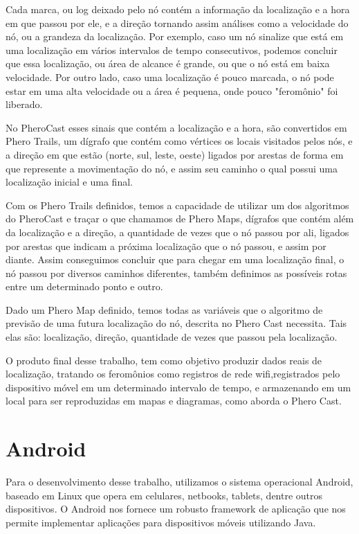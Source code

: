 \documentclass[12pt, %
openright, 
oneside,
a4paper,
brazil]{facom-ufu-abntex2}
\begin{document}
	Cada marca, ou log deixado pelo nó contém a informação da localização e a hora em que passou por ele, e a direção  tornando assim análises como a velocidade do nó, ou a grandeza da localização. Por exemplo, caso um nó sinalize que está em uma localização em vários intervalos de tempo consecutivos, podemos concluir que essa localização, ou área de alcance é grande, ou que o nó está em baixa velocidade. Por outro lado, caso uma localização é pouco marcada, o nó pode estar em uma alta velocidade ou a área é pequena, onde pouco "feromônio" foi liberado.
	
	No PheroCast esses sinais que contém a localização e a hora, são convertidos em Phero Trails, um dígrafo que contém como vértices os locais visitados pelos nós, e a direção em que estão (norte, sul, leste, oeste) ligados por arestas de forma em que represente a movimentação do nó, e assim seu caminho o qual possui uma localização inicial e uma final.
	
	Com os Phero Trails definidos, temos a capacidade de utilizar um dos algoritmos do PheroCast e traçar o que chamamos de Phero Maps, dígrafos que contém além da localização e a direção, a quantidade de vezes que o nó passou por ali, ligados por arestas que indicam a próxima localização que o nó passou, e assim por diante. Assim conseguimos concluir que para chegar em uma localização final, o nó passou por diversos caminhos diferentes, também definimos as possíveis rotas entre um determinado ponto e outro.
	
	Dado um Phero Map definido, temos todas as variáveis que o algoritmo de previsão de uma futura localização do nó, descrita no Phero Cast necessita. Tais elas são: localização, direção, quantidade de vezes que passou pela localização. 

 	O produto final desse trabalho, tem como objetivo produzir dados reais de localização, tratando os feromônios como registros de rede wifi,registrados pelo dispositivo móvel em um determinado intervalo de tempo, e armazenando em um local para ser reproduzidas em mapas e diagramas, como aborda o Phero Cast.
	

\section{Android}

	Para o desenvolvimento desse trabalho, utilizamos o sistema operacional Android, baseado em Linux que opera em celulares, netbooks, tablets, dentre outros dispositivos. O Android nos fornece um robusto framework de aplicação que nos permite implementar aplicações para dispositivos móveis utilizando Java.
	
\end{document}
